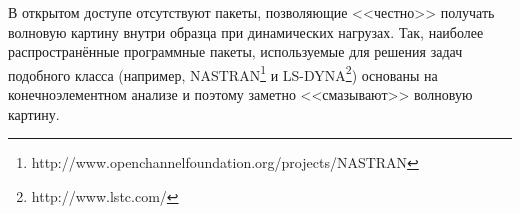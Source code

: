 В открытом доступе отсутствуют пакеты, позволяющие <<честно>> получать волновую картину внутри образца при динамических нагрузах. Так, наиболее распространённые программные пакеты, используемые для решения задач подобного класса (например, NASTRAN\footnote{http://www.openchannelfoundation.org/projects/NASTRAN} и LS-DYNA\footnote{http://www.lstc.com/}) основаны на конечноэлементном анализе и поэтому  заметно <<смазывают>> волновую картину.
